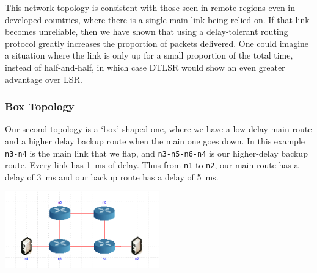 \documentclass[10pt,twoside,a4paper]{article}
\begin{document}
This network topology is consistent with those seen in remote regions even in developed countries, where there is a single main link being relied on. If that link becomes unreliable, then we have shown that using a delay-tolerant routing protocol greatly increases the proportion of packets delivered. One could imagine a situation where the link is only up for a small proportion of the total time, instead of half-and-half, in which case DTLSR would show an even greater advantage over LSR.


\subsubsection{Box Topology}

Our second topology is a `box'-shaped one, where we have a low-delay main route and a higher delay backup route when the main one goes down. In this example \texttt{n3-n4} is the main link that we flap, and \texttt{n3-n5-n6-n4} is our higher-delay backup route. Every link has \SI{1}{\ms} of delay. Thus from \texttt{n1} to \texttt{n2}, our main route has a delay of \SI{3}{\ms} and our backup route has a delay of \SI{5}{\ms}.

\begin{minipage}{1\textwidth} \centering
	\includegraphics[width=0.5\textwidth]{delay_box_topology}
\end{minipage}

\end{document}
